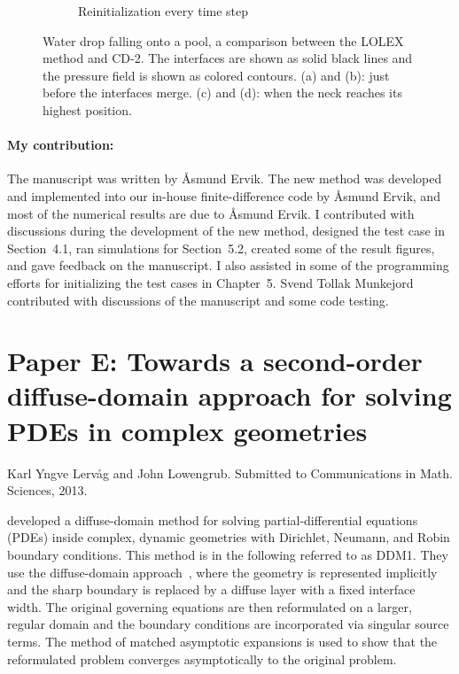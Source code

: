 \documentclass[11pt,b5paper,DIV=calc,BCOR1.3cm,headings=small,%
               footinclude=false,headsepline]{scrbook}
\begin{document}
\begin{figure}[tbp]
\begin{subfigure}[t]{0.47\textwidth}
    \caption{Reinitialization every time step}
  \end{subfigure}
  \caption{Water drop falling onto a pool, a comparison between the LOLEX
    method and CD-2.  The interfaces are shown as solid black lines and the
    pressure field is shown as colored contours.  (a) and (b): just before the
    interfaces merge.  (c) and (d):  when the neck reaches its highest
    position.}
  \label{fig:D3}
\end{figure}

\paragraph{My contribution:}  The manuscript was written by Åsmund Ervik.  The
new method was developed and implemented into our in-house finite-difference
code by Åsmund Ervik, and most of the numerical results are due to Åsmund
Ervik.  I contributed with discussions during the development of the new
method, designed the test case in Section~4.1, ran simulations for Section~5.2,
created some of the result figures, and gave feedback on the manuscript.
I also assisted in some of the programming efforts for initializing the test
cases in Chapter~5.  Svend Tollak Munkejord contributed with discussions of the
manuscript and some code testing.

\clearpage
\section[Paper E]{Paper E:  Towards a second-order diffuse-domain approach for
  solving PDEs in complex geometries}
Karl Yngve Lervåg and John Lowengrub.  Submitted to Communications in Math.
Sciences, 2013.

\citet{Li09} developed a diffuse-domain method for solving partial-differential
equations (PDEs) inside complex, dynamic geometries with Dirichlet, Neumann,
and Robin boundary conditions.  This method is in the following referred to as
DDM1.  They use the diffuse-domain approach~\cite{Kockelkoren03}, where the
geometry is represented implicitly and the sharp boundary is replaced by
a diffuse layer with a fixed interface width.  The original governing equations
are then reformulated on a larger, regular domain and the boundary conditions
are incorporated via singular source terms.  The method of matched asymptotic
expansions is used to show that the reformulated problem converges
asymptotically to the original problem.
\end{document}
